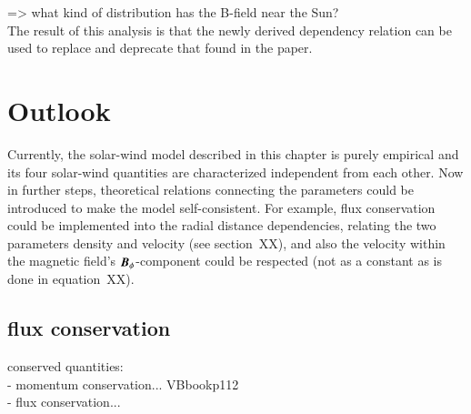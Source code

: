 \begin{figure}[htb]
\end{figure}

=> what kind of distribution has the B-field near the Sun?\\

The result of this analysis is that the newly derived dependency relation can be used to replace and deprecate that found in the paper.\\



\section{Outlook}
Currently, the solar-wind model described in this chapter is purely empirical and its four solar-wind quantities are characterized independent from each other. Now in further steps, theoretical relations connecting the parameters could be introduced to make the model self-consistent. For example, flux conservation could be implemented into the radial distance dependencies, relating the two parameters density and velocity (see section~XX), and also the velocity within the magnetic field's $\boldsymbol{B}_\phi$-component could be respected (not as a constant as is done in equation~XX).\\


\subsection{flux conservation}
conserved quantities:\\
- momentum conservation... VBbookp112\\
- flux conservation...\\

